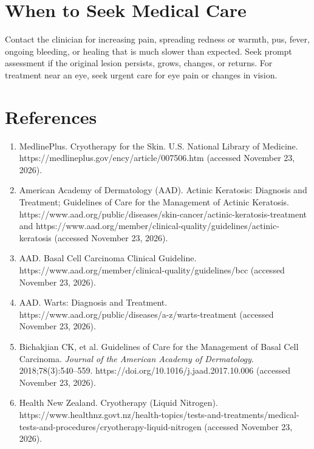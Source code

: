 \section*{When to Seek Medical Care}
Contact the clinician for increasing pain, spreading redness or warmth, pus, fever, ongoing bleeding, or healing that is much slower than expected. Seek prompt assessment if the original lesion persists, grows, changes, or returns. For treatment near an eye, seek urgent care for eye pain or changes in vision.

\section*{References}
\begin{enumerate}
  \item MedlinePlus. Cryotherapy for the Skin. U.S. National Library of Medicine. https://medlineplus.gov/ency/article/007506.htm (accessed November 23, 2026).
  \item American Academy of Dermatology (AAD). Actinic Keratosis: Diagnosis and Treatment; Guidelines of Care for the Management of Actinic Keratosis. https://www.aad.org/public/diseases/skin-cancer/actinic-keratosis-treatment and https://www.aad.org/member/clinical-quality/guidelines/actinic-keratosis (accessed November 23, 2026).
  \item AAD. Basal Cell Carcinoma Clinical Guideline. https://www.aad.org/member/clinical-quality/guidelines/bcc (accessed November 23, 2026).
  \item AAD. Warts: Diagnosis and Treatment. https://www.aad.org/public/diseases/a-z/warts-treatment (accessed November 23, 2026).
  \item Bichakjian CK, et al. Guidelines of Care for the Management of Basal Cell Carcinoma. \textit{Journal of the American Academy of Dermatology}. 2018;78(3):540--559. https://doi.org/10.1016/j.jaad.2017.10.006 (accessed November 23, 2026).
  \item Health New Zealand. Cryotherapy (Liquid Nitrogen). https://www.healthnz.govt.nz/health-topics/tests-and-treatments/medical-tests-and-procedures/cryotherapy-liquid-nitrogen (accessed November 23, 2026).
\end{enumerate}
\clearpage
